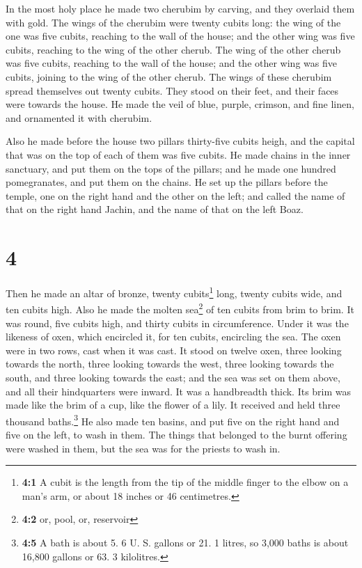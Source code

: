  In the most holy place he made two cherubim by carving,
and they overlaid them with gold.  The wings of the
cherubim were twenty cubits long: the wing of the one was five cubits,
reaching to the wall of the house; and the other wing was five cubits,
reaching to the wing of the other cherub.  The wing of
the other cherub was five cubits, reaching to the wall of the house; and
the other wing was five cubits, joining to the wing of the other cherub.
 The wings of these cherubim spread themselves out twenty
cubits. They stood on their feet, and their faces were towards the
house.  He made the veil of blue, purple, crimson, and
fine linen, and ornamented it with cherubim.

 Also he made before the house two pillars thirty-five
cubits heigh, and the capital that was on the top of each of them was
five cubits.  He made chains in the inner sanctuary, and
put them on the tops of the pillars; and he made one hundred
pomegranates, and put them on the chains.  He set up the
pillars before the temple, one on the right hand and the other on the
left; and called the name of that on the right hand Jachin, and the name
of that on the left Boaz.

\hypertarget{section-3}{%
\section{4}\label{section-3}}

 Then he made an altar of bronze, twenty cubits\footnote{\textbf{4:1}
  A cubit is the length from the tip of the middle finger to the elbow
  on a man's arm, or about 18 inches or 46 centimetres.} long, twenty
cubits wide, and ten cubits high.  Also he made the molten
sea\footnote{\textbf{4:2} or, pool, or, reservoir} of ten cubits from
brim to brim. It was round, five cubits high, and thirty cubits in
circumference.  Under it was the likeness of oxen, which
encircled it, for ten cubits, encircling the sea. The oxen were in two
rows, cast when it was cast.  It stood on twelve oxen,
three looking towards the north, three looking towards the west, three
looking towards the south, and three looking towards the east; and the
sea was set on them above, and all their hindquarters were inward.
 It was a handbreadth thick. Its brim was made like the
brim of a cup, like the flower of a lily. It received and held three
thousand baths.\footnote{\textbf{4:5} A bath is about 5. 6 U. S. gallons
  or 21. 1 litres, so 3,000 baths is about 16,800 gallons or 63. 3
  kilolitres.}  He also made ten basins, and put five on
the right hand and five on the left, to wash in them. The things that
belonged to the burnt offering were washed in them, but the sea was for
the priests to wash in.

